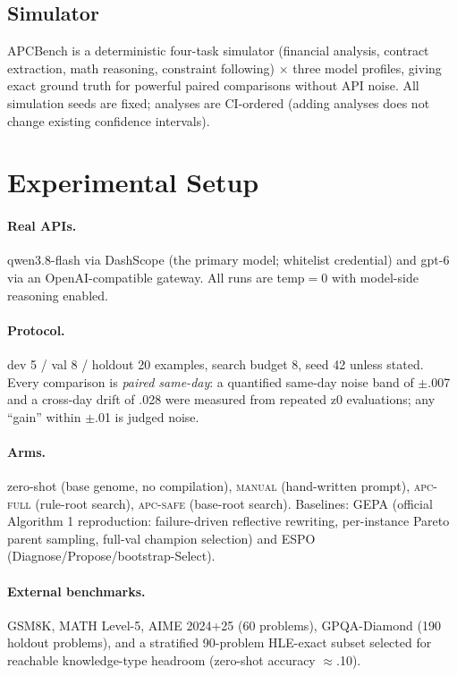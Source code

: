 \documentclass[11pt]{article}
\newcommand{\zs}{zero-shot}
\begin{document}
\subsection{Simulator}
APCBench is a deterministic four-task simulator (financial analysis, contract extraction, math reasoning, constraint following) $\times$ three model profiles, giving exact ground truth for powerful paired comparisons without API noise. All simulation seeds are fixed; analyses are CI-ordered (adding analyses does not change existing confidence intervals).

\section{Experimental Setup}
\label{sec:setup}

\paragraph{Real APIs.} qwen3.8-flash via DashScope (the primary model; whitelist credential) and gpt-6 via an OpenAI-compatible gateway. All runs are temp$=0$ with model-side reasoning enabled.

\paragraph{Protocol.} dev 5 / val 8 / holdout 20 examples, search budget 8, seed 42 unless stated. Every comparison is \emph{paired same-day}: a quantified same-day noise band of $\pm$.007 and a cross-day drift of .028 were measured from repeated z0 evaluations; any ``gain'' within $\pm$.01 is judged noise.

\paragraph{Arms.} \zs{} (base genome, no compilation), \textsc{manual} (hand-written prompt), \textsc{apc-full} (rule-root search), \textsc{apc-safe} (base-root search). Baselines: GEPA (official Algorithm 1 reproduction: failure-driven reflective rewriting, per-instance Pareto parent sampling, full-val champion selection) and ESPO (Diagnose/Propose/bootstrap-Select).

\paragraph{External benchmarks.} GSM8K, MATH Level-5, AIME 2024+25 (60 problems), GPQA-Diamond (190 holdout problems), and a stratified 90-problem HLE-exact subset selected for reachable knowledge-type headroom (zero-shot accuracy $\approx$.10).
\end{document}
